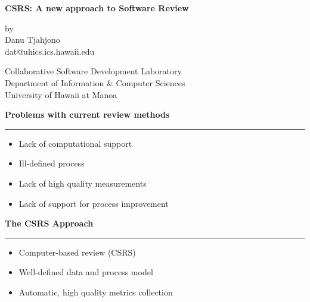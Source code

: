 
%
\newcommand{\horizontalline} {\rule{\textwidth}{.02in}} 
\pagestyle{empty}
      


\begin{slide} \Huge
  \begin{center}
    {\bf CSRS: A new approach to Software Review} \\

    \vspace{0.5in}

    by\\
    Danu Tjahjono\\
    {\sf dat@uhics.ics.hawaii.edu}
    
    \vspace{0.5in}
    
    Collaborative Software Development Laboratory \\
    Department of Information \& Computer Sciences\\
    University of Hawaii at Manoa
  \end{center}
\end{slide} \Huge  


\begin{slide} \Huge
  {\bf Problems with current review methods}
  \horizontalline
  \begin{itemize}
  \item Lack of computational support
  \item Ill-defined process
  \item Lack of high quality measurements 
   \item Lack of support for process improvement
  \end{itemize}
\end {slide} \Huge

\begin{slide} \Huge
  {\bf The CSRS Approach} 
\horizontalline
\begin{itemize}
 \item Computer-based review (CSRS)
 \item Well-defined data and process model
 \item Automatic, high quality metrics collection
\end{itemize}
\end {slide} \Huge

